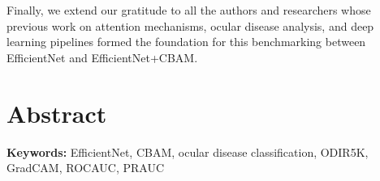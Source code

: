 \documentclass[12pt,a4paper]{report}
\begin{document}
Finally, we extend our gratitude to all the authors and researchers whose previous work on attention mechanisms, ocular disease analysis, and deep learning pipelines formed the foundation for this benchmarking between EfficientNet and EfficientNet+CBAM.
\fi

\clearpage
\chapter*{Abstract}

\vspace{0.8em}
\textbf{Keywords:} EfficientNet, CBAM, ocular disease classification, ODIR\textendash 5K, Grad\textendash CAM, ROC\textendash AUC, PR\textendash AUC

\clearpage
\ifdefined\WITHOUTACK
\setcounter{page}{4} %
\else
\setcounter{page}{5} %
\fi
\tableofcontents
\clearpage
\listoffigures
\clearpage
\listoftables
\clearpage












% 



\clearpage


\end{document}

